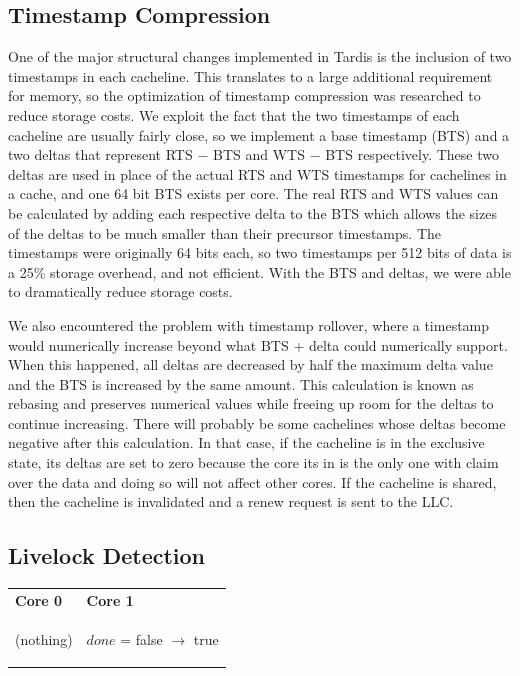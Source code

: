 \documentclass[12pt]{article}
\begin{document}
\subsection{Timestamp Compression}

One of the major structural changes implemented in Tardis is the 
inclusion of two timestamps in each cacheline. This translates to a 
large additional requirement for memory, so the optimization of 
timestamp compression was researched to reduce storage costs. We 
exploit the fact that the two timestamps of each cacheline are usually 
fairly close, so we implement a base timestamp (BTS) and a two deltas 
that represent RTS $-$ BTS and WTS $-$ BTS respectively. These two 
deltas are used in place of the actual RTS and WTS timestamps for 
cachelines in a cache, and one 64 bit BTS exists per core. The real 
RTS and WTS values can be calculated by adding each respective delta 
to the BTS which allows the sizes of the deltas to be much smaller 
than their precursor timestamps. The timestamps were originally 64 
bits each, so two timestamps per 512 bits of data is a 25\% storage 
overhead, and not efficient.  With the BTS and deltas, we were able to 
dramatically reduce storage costs. 

We also encountered the problem with timestamp rollover, where a 
timestamp would numerically increase beyond what BTS + delta could 
numerically support. When this happened, all deltas are decreased by 
half the maximum delta value and the BTS is increased by the same 
amount. This calculation is known as rebasing and preserves numerical 
values while freeing up room for the deltas to continue increasing.  
There will probably be some cachelines whose deltas become negative 
after this calculation. In that case, if the cacheline is in the 
exclusive state, its deltas are set to zero because the core its in is the 
only one with claim over the data and doing so will not affect other 
cores. If the cacheline is shared, then the cacheline is invalidated 
and a renew request is sent to the LLC. 

\subsection{Livelock Detection} \label{sec:livelock-detection}

\begin{center}
	
	\begin{tabular}{p{5cm} p{5cm}}
		\textbf{Core 0} & \textbf{Core 1} \\
		\begin{algorithm}[H]
			\While{!done}
			{(nothing)}
			
		\end{algorithm}
		&
		\begin{algorithm}[H]
			$done$ = false $\rightarrow$  true
		\end{algorithm}
		\\
	\end{tabular}
	
\end{center}
\end{document}
